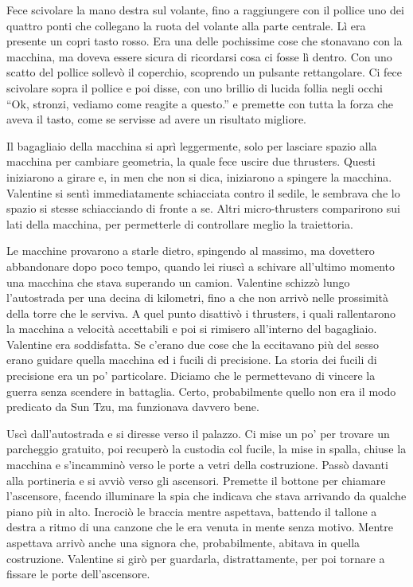     Fece scivolare la mano destra sul volante, fino a raggiungere con il pollice uno dei quattro ponti che collegano la
    ruota del volante alla parte centrale. Lì era presente un copri tasto rosso. Era una delle pochissime cose che
    stonavano con la macchina, ma doveva essere sicura di ricordarsi cosa ci fosse lì dentro. Con uno scatto del pollice
    sollevò il coperchio, scoprendo un pulsante rettangolare. Ci fece scivolare sopra il pollice e poi disse, con uno
    brillio di lucida follia negli occhi ``Ok, stronzi, vediamo come reagite a questo.'' e premette con tutta la forza
    che aveva il tasto, come se servisse ad avere un risultato migliore.

    Il bagagliaio della macchina si aprì leggermente, solo per lasciare spazio alla macchina per cambiare geometria, la
    quale fece uscire due thrusters. Questi iniziarono a girare e, in men che non si dica, iniziarono a spingere la
    macchina. Valentine si sentì immediatamente schiacciata contro il sedile, le sembrava che lo spazio si stesse
    schiacciando di fronte a se. Altri micro-thrusters comparirono sui lati della macchina, per permetterle di
    controllare meglio la traiettoria.
    
    Le macchine provarono a starle dietro, spingendo al massimo, ma dovettero abbandonare dopo poco tempo, quando lei
    riuscì a schivare all'ultimo momento una macchina che stava superando un camion. Valentine schizzò lungo
    l'autostrada per una decina di kilometri, fino a che non arrivò nelle prossimità della torre che le serviva. A quel
    punto disattivò i thrusters, i quali rallentarono la macchina a velocità accettabili e poi si rimisero all'interno
    del bagagliaio. Valentine era soddisfatta. Se c'erano due cose che la eccitavano più del sesso erano guidare quella
    macchina ed i fucili di precisione. La storia dei fucili di precisione era un po' particolare. Diciamo che le
    permettevano di vincere la guerra senza scendere in battaglia. Certo, probabilmente quello non era il modo predicato
    da Sun Tzu, ma funzionava davvero bene.

    Uscì dall'autostrada e si diresse verso il palazzo. Ci mise un po' per trovare un parcheggio gratuito, poi recuperò
    la custodia col fucile, la mise in spalla, chiuse la macchina e s'incamminò verso le porte a vetri della costruzione. Passò davanti alla portineria
    e si avviò verso gli ascensori. Premette il bottone per chiamare l'ascensore, facendo illuminare la spia che
    indicava che stava arrivando da qualche piano più in alto. Incrociò le braccia mentre aspettava, battendo il tallone
    a destra a ritmo di una canzone che le era venuta in mente senza motivo. Mentre aspettava arrivò anche una signora
    che, probabilmente, abitava in quella costruzione. Valentine si girò per guardarla, distrattamente, per poi tornare
    a fissare le porte dell'ascensore.

